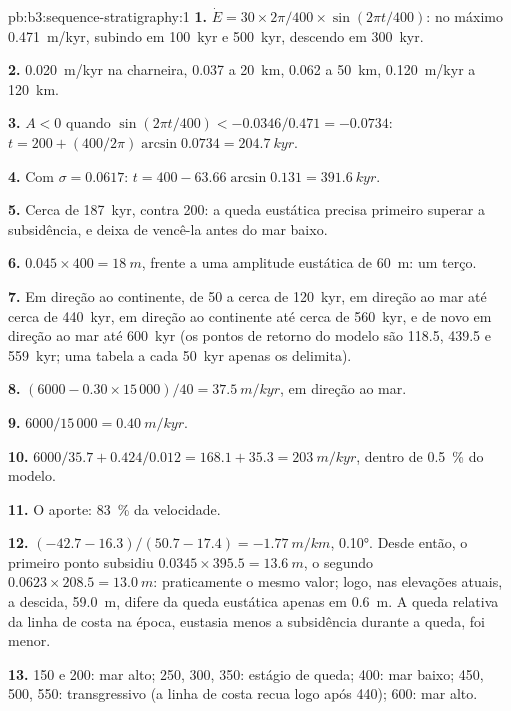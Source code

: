 \begin{solution}{pb:b3:sequence-stratigraphy:1}
\textbf{1.} $\dot E = 30\times2\pi/400\times\sin(2\pi t/400)$: no máximo
\qty{0.471}{m/kyr}, subindo em \qty{100}{kyr} e \qty{500}{kyr}, descendo em
\qty{300}{kyr}.

\textbf{2.} \qty{0.020}{m/kyr} na charneira, 0.037 a \qty{20}{km}, 0.062 a
\qty{50}{km}, \qty{0.120}{m/kyr} a \qty{120}{km}.

\textbf{3.} $A < 0$ quando $\sin(2\pi t/400) < -0.0346/0.471 = -0.0734$: $t =
200 + (400/2\pi)\arcsin0.0734 = \qty{204.7}{kyr}$.

\textbf{4.} Com $\sigma = 0.0617$: $t = 400 - 63.66\arcsin0.131 =
\qty{391.6}{kyr}$.

\textbf{5.} Cerca de \qty{187}{kyr}, contra 200: a queda eustática precisa primeiro
superar a subsidência, e deixa de vencê-la antes do mar baixo.

\textbf{6.} $0.045\times400 = \qty{18}{m}$, frente a uma amplitude eustática de
\qty{60}{m}: um terço.

\textbf{7.} Em direção ao continente, de 50 a cerca de \qty{120}{kyr}, em direção ao mar até cerca de
\qty{440}{kyr}, em direção ao continente até cerca de \qty{560}{kyr}, e de novo em direção ao mar até
\qty{600}{kyr} (os pontos de retorno do modelo são 118.5, 439.5 e
\qty{559}{kyr}; uma tabela a cada \qty{50}{kyr} apenas os delimita).

\textbf{8.} $(6000 - 0.30\times15\,000)/40 = \qty{37.5}{m/kyr}$, em direção ao mar.

\textbf{9.} $6000/15\,000 = \qty{0.40}{m/kyr}$.

\textbf{10.} $6000/35.7 + 0.424/0.012 = 168.1 + 35.3 = \qty{203}{m/kyr}$,
dentro de \qty{0.5}{\percent} do modelo.

\textbf{11.} O aporte: \qty{83}{\percent} da velocidade.

\textbf{12.} $(-42.7 - 16.3)/(50.7 - 17.4) = \qty{-1.77}{m/km}$, \ang{0.10}.
Desde então, o primeiro ponto subsidiu $0.0345\times395.5 =
\qty{13.6}{m}$, o segundo $0.0623\times208.5 = \qty{13.0}{m}$: praticamente
o mesmo valor; logo, nas elevações atuais, a descida, \qty{59.0}{m}, difere da
queda eustática apenas em \qty{0.6}{m}. A queda relativa da linha de costa na
época, eustasia menos a subsidência durante a queda, foi menor.

\textbf{13.} 150 e 200: mar alto; 250, 300, 350: estágio de queda; 400:
mar baixo; 450, 500, 550: transgressivo (a linha de costa recua logo após
440); 600: mar alto.


\end{solution}
